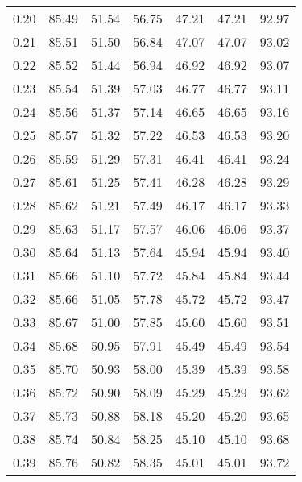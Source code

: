 \begin{tabular}{|c|c|c|c|c|c|c|}
      0.20 &     85.49 &     51.54 &      56.75 &   47.21 &      47.21 &         92.97 \\
      0.21 &     85.51 &     51.50 &      56.84 &   47.07 &      47.07 &         93.02 \\
      0.22 &     85.52 &     51.44 &      56.94 &   46.92 &      46.92 &         93.07 \\
      0.23 &     85.54 &     51.39 &      57.03 &   46.77 &      46.77 &         93.11 \\
      0.24 &     85.56 &     51.37 &      57.14 &   46.65 &      46.65 &         93.16 \\
      0.25 &     85.57 &     51.32 &      57.22 &   46.53 &      46.53 &         93.20 \\
      0.26 &     85.59 &     51.29 &      57.31 &   46.41 &      46.41 &         93.24 \\
      0.27 &     85.61 &     51.25 &      57.41 &   46.28 &      46.28 &         93.29 \\
      0.28 &     85.62 &     51.21 &      57.49 &   46.17 &      46.17 &         93.33 \\
      0.29 &     85.63 &     51.17 &      57.57 &   46.06 &      46.06 &         93.37 \\
      0.30 &     85.64 &     51.13 &      57.64 &   45.94 &      45.94 &         93.40 \\
      0.31 &     85.66 &     51.10 &      57.72 &   45.84 &      45.84 &         93.44 \\
      0.32 &     85.66 &     51.05 &      57.78 &   45.72 &      45.72 &         93.47 \\
      0.33 &     85.67 &     51.00 &      57.85 &   45.60 &      45.60 &         93.51 \\
      0.34 &     85.68 &     50.95 &      57.91 &   45.49 &      45.49 &         93.54 \\
      0.35 &     85.70 &     50.93 &      58.00 &   45.39 &      45.39 &         93.58 \\
      0.36 &     85.72 &     50.90 &      58.09 &   45.29 &      45.29 &         93.62 \\
      0.37 &     85.73 &     50.88 &      58.18 &   45.20 &      45.20 &         93.65 \\
      0.38 &     85.74 &     50.84 &      58.25 &   45.10 &      45.10 &         93.68 \\
      0.39 &     85.76 &     50.82 &      58.35 &   45.01 &      45.01 &         93.72 \\

\end{tabular}
